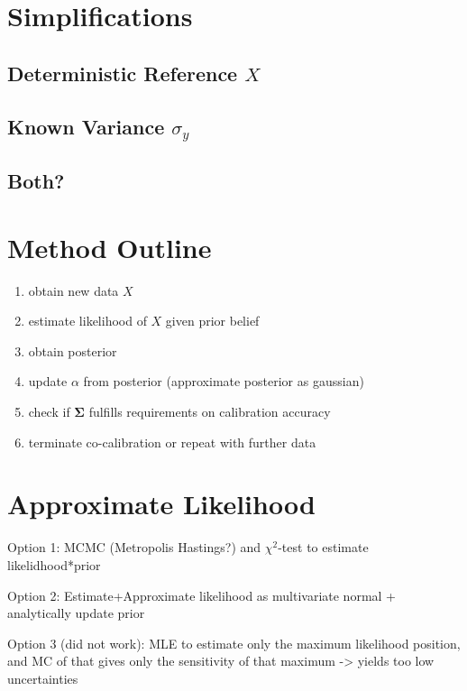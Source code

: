 \documentclass[10pt]{article}
\newcommand{\mat}[1]{\boldsymbol{#1}}
\begin{document}
    
\section{Simplifications}

\subsection{Deterministic Reference $X$}

\subsection{Known Variance $\sigma_y$}

\subsection{Both?}


\section{Method Outline}
\begin{enumerate}
    \item obtain new data $X$
    \item estimate likelihood of $X$ given prior belief
    \item obtain posterior
    \item update $\alpha$ from posterior (approximate posterior as gaussian)
    \item check if $\mat{\Sigma}$ fulfills requirements on calibration accuracy
    \item terminate co-calibration or repeat with further data
\end{enumerate}



\section{Approximate Likelihood}

Option 1: MCMC (Metropolis Hastings?) and $\chi^2$-test to estimate likelidhood*prior

Option 2: Estimate+Approximate likelihood as multivariate normal + analytically update prior

Option 3 (did not work): MLE to estimate only the maximum likelihood position, and MC of that gives only the sensitivity of that maximum -> yields too low uncertainties



    
\end{document}
